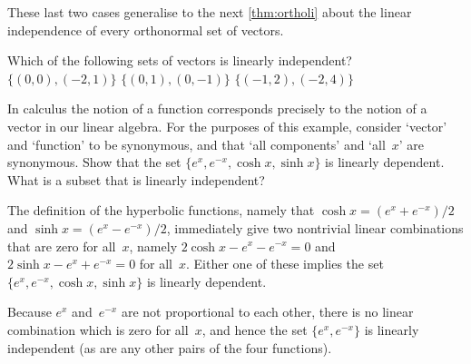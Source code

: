 \begin{example}
\begin{enumerate}
\end{enumerate}
These last two cases generalise to the next \autoref{thm:ortholi} about the linear independence of every orthonormal set of vectors.
\end{example}



\begin{activity}
Which of the following sets of vectors is linearly independent?
{\(\{(0,0),(-2,1)\}\)}
{\(\{(0,1),(0,-1)\}\)}
{\(\{(-1,2),(-2,4)\}\)}
\end{activity}



\begin{example} \label{eg:}
In calculus the notion of a function corresponds precisely to the notion of a vector in our linear algebra.  
For the purposes of this example, consider `vector' and `function' to be synonymous, and that `all components' and `all~\(x\)' are synonymous. 
Show that the set \(\{e^x,e^{-x},\cosh x,\sinh x\}\) is linearly dependent.  
What is a subset that is linearly independent?
\begin{solution} 
The definition of the hyperbolic functions, namely that \(\cosh x=(e^x+e^{-x})/2\) and \(\sinh x=(e^x-e^{-x})/2\), immediately give two nontrivial linear combinations that are zero for all~\(x\), namely \(2\cosh x-e^x-e^{-x}=0\) and \(2\sinh x-e^x+e^{-x}=0\) for all~\(x\).
Either one of these implies the set \(\{e^x,e^{-x},\cosh x,\sinh x\}\) is linearly dependent.

Because \(e^x\) and~\(e^{-x}\) are not proportional to each other, there is no linear combination which is zero for all~\(x\), and hence the set \(\{e^x,e^{-x}\}\) is linearly independent (as are any other pairs of the four functions).
\end{solution}
\end{example}







